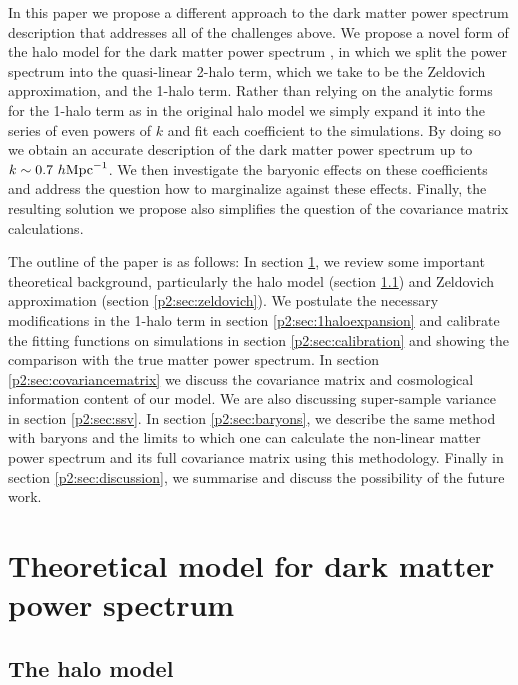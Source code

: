 \documentclass[
  11pt,
  twoside,
  openright,
  titlepage,
  headings=optiontoheadandtoc
]{scrbook}
\begin{document}
In this paper we propose a different approach to the dark matter power spectrum description that addresses 
all of the challenges above. We propose a novel form of the 
halo model for the dark matter power spectrum 
\citep{2000MNRAS.318..203S,2000MNRAS.318.1144P,2000ApJ...543..503M,2002PhR...372....1C}, in which we split the power spectrum into the quasi-linear 2-halo 
term, which we take to be the Zeldovich 
approximation, and the 1-halo term. Rather than relying on the analytic forms for the 1-halo term as in 
the original halo model \citep{2000MNRAS.318..203S,2000ApJ...543..503M} we simply expand 
it into the series of even powers of $k$ and fit each coefficient to the simulations. 
By doing so we obtain an accurate description of the dark matter power spectrum up to $k \sim 0.7\ h \rm{Mpc}^{-1}$. 
We then investigate the 
baryonic effects on these coefficients and address the question how to marginalize against these effects. Finally, 
the resulting solution we propose also simplifies the question of the covariance matrix calculations. 

The outline of the paper is as follows: In section \ref{p2:sec:theory}, we review some important theoretical background, particularly the halo model (section \ref{p2:sec:halomodel}) and Zeldovich approximation (section \ref{p2:sec:zeldovich}). We postulate the necessary modifications in the 1-halo term in section \ref{p2:sec:1haloexpansion} and calibrate the fitting functions on simulations in section \ref{p2:sec:calibration} and showing the comparison with the true matter power spectrum. In section \ref{p2:sec:covariancematrix} we discuss the covariance matrix and cosmological information content of our model. We are also discussing super-sample variance in section \ref{p2:sec:ssv}. In section \ref{p2:sec:baryons}, we describe the same method with baryons and the limits to which one can calculate the non-linear matter power spectrum and its full covariance matrix using this methodology. Finally in section \ref{p2:sec:discussion}, we summarise and discuss the possibility of the future work.

\section{Theoretical model for dark matter power spectrum}
\label{p2:sec:theory}

\subsection{The halo model}\label{p2:sec:halomodel}
\end{document}
